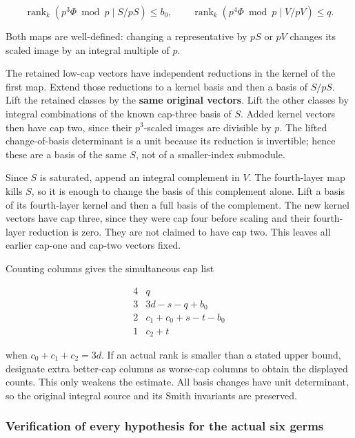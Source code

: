 \documentclass[11pt,a4paper]{article}
\begin{document}
\[
\operatorname{rank}_k(p^3\Phi\bmod p\mid S/pS)\le b_0,
\qquad
\operatorname{rank}_k(p^4\Phi\bmod p\mid V/pV)\le q.
\]

Both maps are well-defined: changing a representative by \(pS\) or \(pV\) changes its scaled image by an integral multiple of \(p\).

The retained low-cap vectors have independent reductions in the kernel of the first map. Extend those reductions to a kernel basis and then a basis of \(S/pS\). Lift the retained classes by the \textbf{same original vectors}. Lift the other classes by integral combinations of the known cap-three basis of \(S\). Added kernel vectors then have cap two, since their \(p^{3}\)-scaled images are divisible by \(p\). The lifted change-of-basis determinant is a unit because its reduction is invertible; hence these are a basis of the same \(S\), not of a smaller-index submodule.

Since \(S\) is saturated, append an integral complement in \(V\). The fourth-layer map kills \(S\), so it is enough to change the basis of this complement alone. Lift a basis of its fourth-layer kernel and then a full basis of the complement. The new kernel vectors have cap three, since they were cap four before scaling and their fourth-layer reduction is zero. They are not claimed to have cap two. This leaves all earlier cap-one and cap-two vectors fixed.

Counting columns gives the simultaneous cap list

\[
\begin{array}{c|c}
4&q\\
3&3d-s-q+b_0\\
2&c_1+c_0+s-t-b_0\\
1&c_2+t
\end{array}
\]

when \(c_{0}+c_{1}+c_{2}=3d\). If an actual rank is smaller than a stated upper bound, designate extra better-cap columns as worse-cap columns to obtain the displayed counts. This only weakens the estimate. All basis changes have unit determinant, so the original integral source and its Smith invariants are preserved.

\hypertarget{verification-of-every-hypothesis-for-the-actual-six-germs}{%
\subsubsection{Verification of every hypothesis for the actual six germs}\label{verification-of-every-hypothesis-for-the-actual-six-germs}}
\end{document}
